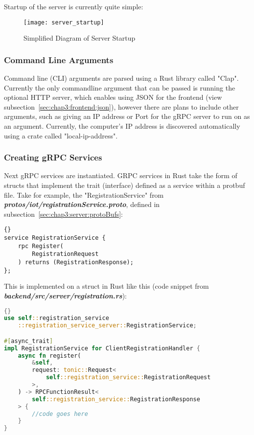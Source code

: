 Startup of the server is currently quite simple:

\begin{figure}[h]
\caption{Simplified Diagram of Server Startup}
\texttt{[image: server\_startup]}
\end{figure}

\subsubsection{Command Line Arguments}
Command line (CLI) arguments are parsed using a Rust library called "Clap". Currently the only commandline argument that can be passed is running the optional HTTP server, which enables using JSON for the frontend (view subsection~\ref{sec:chap3:frontend:json}), however there are plans to include other arguments, such as giving an IP address or Port for the gRPC server to run on as an argument. Currently, the computer's IP address is discovered automatically using a crate called "local-ip-address". 

\subsubsection{Creating gRPC Services}
Next gRPC services are instantiated. GRPC services in Rust take the form of structs that implement the trait (interface) defined as a service within a protbuf file. Take for example, the "RegistrationService" from \textbf{\textit{protos/iot/registrationService.proto}}, defined in subsection~\ref{sec:chap3:server:protoBufs}:
\begin{lstlisting}[language=protobuf3, style=boxed, showstringspaces=false]{}
service RegistrationService {
    rpc Register(
        RegistrationRequest
    ) returns (RegistrationResponse);
};
\end{lstlisting}

This is implemented on a struct in Rust like this (code snippet from \textit{\textbf{backend/src/server/registration.rs}}):
\begin{lstlisting}[language=Rust, style=boxed, showstringspaces=false]{}
use self::registration_service
    ::registration_service_server::RegistrationService;

#[async_trait]
impl RegistrationService for ClientRegistrationHandler {
    async fn register(
        &self,
        request: tonic::Request<
            self::registration_service::RegistrationRequest
        >,
    ) -> RPCFunctionResult<
        self::registration_service::RegistrationResponse
    > {
        //code goes here
    }
}
\end{lstlisting}

